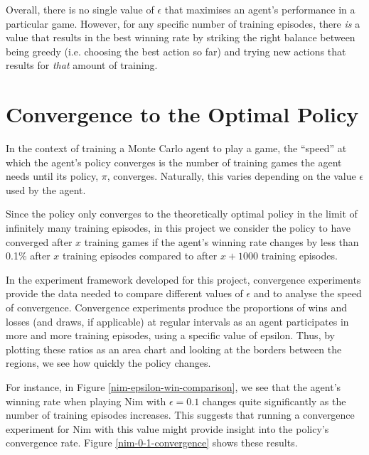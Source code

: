 \documentclass[11pt,a4paper]{report}
\begin{document}
Overall, there is no single value of $\epsilon$ that maximises an agent's performance in a particular game. However, for any specific number of training episodes, there \emph{is} a value that results in the best winning rate by striking the right balance between being greedy (i.e. choosing the best action so far) and trying new actions that results for \emph{that} amount of training.



\section{Convergence to the Optimal Policy}

In the context of training a Monte Carlo agent to play a game, the ``speed'' at which the agent's policy converges is the number of training games the agent needs until its policy, $\pi$, converges. Naturally, this varies depending on the value $\epsilon$ used by the agent.

Since the policy only converges to the theoretically optimal policy in the limit of infinitely many training episodes, in this project we consider the policy to have converged after $x$ training games if the agent's winning rate changes by less than 0.1\% after $x$ training episodes compared to after $x+1000$ training episodes.

In the experiment framework developed for this project, convergence experiments provide the data needed to compare different values of $\epsilon$ and to analyse the speed of convergence. Convergence experiments produce the proportions of wins and losses (and draws, if applicable) at regular intervals as an agent participates in more and more training episodes, using a specific value of epsilon. Thus, by plotting these ratios as an area chart and looking at the borders between the regions, we see how quickly the policy changes.

For instance, in Figure \ref{nim-epsilon-win-comparison}, we see that the agent's winning rate when playing Nim with $\epsilon = 0.1$ changes quite significantly as the number of training episodes increases. This suggests that running a convergence experiment for Nim with this value might provide insight into the policy's convergence rate. Figure \ref{nim-0-1-convergence} shows these results.
\end{document}
